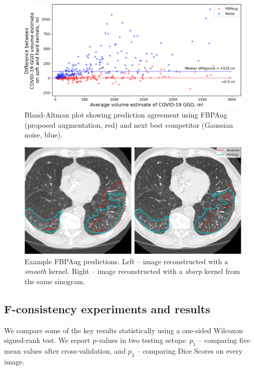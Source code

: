 \begin{figure}[h]
	\centering
	\includegraphics[width=\textwidth]{Dissertation/Figures/3_ct/bland-altman.png}
	\caption{Bland-Altman plot showing prediction agreement using FBPAug (proposed augmentation, red) and next best competitor (Gaussian noise, blue).}
	\label{fig:bland-altman}
\end{figure}

\begin{figure}[h]
	\centering
	\includegraphics[width=\textwidth]{Dissertation/Figures/3_ct/contours_new.png}
	\caption{Example FBPAug predictions. Left -- image reconstructed with a \textit{smooth} kernel. Right -- image reconstructed with a \textit{sharp} kernel from the same sinogram.}
	\label{fig:fbpaug_pred}
	\vspace{2\baselineskip}
\end{figure}

\FloatBarrier %


\subsection{F-consistency experiments and results}

We compare some of the key results statistically using a one-sided Wilcoxon signed-rank test. We report p-values in two testing setups: $p_1$ -- comparing five mean values after cross-validation, and $p_2$ -- comparing Dice Scores on every image.%


